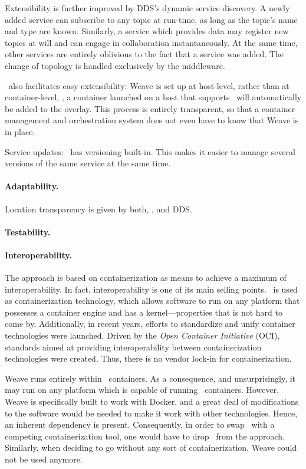Extensibility is further improved by DDS's dynamic service discovery. A newly added service can subscribe to any topic at run-time, as long as the topic's name and type are known. Similarly, a service which provides data may register new topics at will and can engage in collaboration instantaneously. At the same time, other services are entirely oblivious to the fact that a service was added. The change of topology is handled exclusively by the middleware.

\wnet\ also facilitates easy extensibility: Weave is set up at host-level, rather than at container-level, \ie , a container launched on a host that supports \wnet\ will automatically be added to the overlay. This process is entirely transparent, so that a container management and orchestration system does not even have to know that Weave is in place.

Service updates: \docker\ has versioning built-in. This makes it easier to manage several versions of the same service at the same time.

\paragraph{Adaptability.}
Location transparency is given by both, \wnet , and DDS.

\paragraph{Testability.}


\paragraph{Interoperability.}
The approach is based on containerization as means to achieve a maximum of interoperability. In fact, interoperability is one of its main selling points. \docker\ is used as containerization technology, which allows software to run on any platform that possesses a container engine and has a kernel---properties that is not hard to come by. Additionally, in recent years, efforts to standardize and unify container technologies were launched. Driven by the \emph{Open Container Initiative} (OCI), standards aimed at providing interoperability between containerization technologies were created. Thus, there is no vendor lock-in for containerization.

Weave runs entirely within \docker\ containers. As a consequence, and unsurprisingly, it may run on any platform which is capable of running \docker\ containers. However, Weave is specifically built to work with Docker, and a great deal of modifications to the software would be needed to make it work with other technologies. Hence, an inherent dependency is present. Consequently, in order to swap \docker\ with a competing containerization tool, one would have to drop \wnet\ from the approach. Similarly, when deciding to go without any sort of containerization, Weave could not be used anymore.

